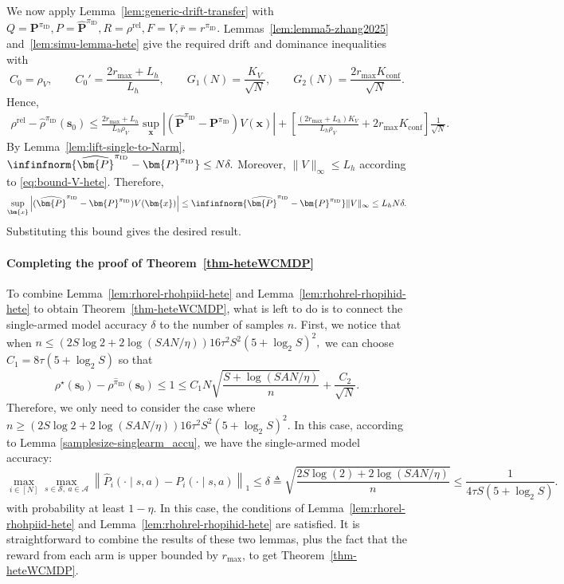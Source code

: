 \documentclass[mnsc,nonblindrev]{informs3}
\newcommand{\bp}{\bm{P}}
\newcommand{\bphat}{\widehat{\bm{P}}}
\newcommand{\piid}{\pi_{\mathrm{ID}}}
\newcommand{\pihid}{\widehat{\pi}_{\mathrm{ID}}}
\newcommand{\bms}{\bm{s}}
\newcommand{\bmx}{\bm{x}}
\newcommand{\rhorel}{\rho^{\mathrm{rel}}}
\begin{document}
We now apply Lemma~\ref{lem:generic-drift-transfer} with
\(
    Q=\bp^{\piid},
    P=\bphat^{\piid},
    R=\rhorel,
    F=V,
    \bar r=r^{\piid}.
\)
Lemmas~\ref{lem:lemma5-zhang2025} and~\ref{lem:simu-lemma-hete} give the
required drift and dominance inequalities with
\[
    C_0=\rho_V,
    \qquad
    C_0'=\frac{2r_{\max}+L_h}{L_h},
    \qquad
    G_1(N)=\frac{K_V}{\sqrt N},
    \qquad
    G_2(N)=\frac{2r_{\max}K_{\mathrm{conf}}}{\sqrt N}.
\]
Hence,
\[
\begin{aligned}
    \rhorel-\widehat\rho^{\piid}(\bms_0)
    \le
    \frac{2r_{\max}+L_h}{L_h\rho_V}
    \sup_{\bmx}
    \left|
    (\bphat^{\piid}-\bp^{\piid})V(\bmx)
    \right|  +
    \left[
    \frac{(2r_{\max}+L_h)K_V}{L_h\rho_V}
    +
    2r_{\max}K_{\mathrm{conf}}
    \right]\frac1{\sqrt N}.
\end{aligned}
\]
By Lemma~\ref{lem:lift-single-to-Narm},
\(
    \infinfnorm{\bphat^{\piid}-\bp^{\piid}}
    \le
    N\delta .
\)
Moreover, \(\|V\|_\infty\le L_h\) according to \eqref{eq:bound-V-hete}. Therefore,
\[
\begin{aligned}
    \sup_{\bmx}
    \left|
    (\bphat^{\piid}-\bp^{\piid})V(\bmx)
    \right|
    \le
    \infinfnorm{\bphat^{\piid}-\bp^{\piid}}\|V\|_\infty 
    \le
    L_hN\delta .
\end{aligned}
\]
Substituting this bound gives the desired result.

\paragraph{Completing the proof of Theorem~\ref{thm-heteWCMDP}}\label{subsec:final-pr-thm1}
To combine Lemma~\ref{lem:rhorel-rhohpiid-hete} and Lemma~\ref{lem:rhohrel-rhopihid-hete} to obtain Theorem~\ref{thm-heteWCMDP}, what is left to do is to connect the single-armed model accuracy $\delta$ to the number of samples $n$. 
First, we notice that when
$
n\le\left(2S\log2+2\log(SAN/\eta)\right)16\tau^2S^2(5+\log_2S)^2,
$
we can choose $C_1=8\tau(5+\log_2S)$ so that
\[
    \rho^\star(\bms_0)-\rho^{\pihid}(\bms_0)\le 1\le C_1N\sqrt{\frac{S + \log (SAN/\eta)}{n}}+\frac{C_2}{\sqrt{N}} .
\]
Therefore, we only need to consider the case where
$n\ge\left(2S\log2+2\log(SAN/\eta)\right)16\tau^2S^2(5+\log_2S)^2.$
In this case, according to Lemma \ref{samplesize-singlearm_accu}, we have the single-armed model accuracy:
\[
\max_{i\in [N]}\max_{s \in \mathcal{S},\ a \in \mathcal{A}} \left\| \widehat{P}_i(\cdot \mid s, a) - P_i(\cdot \mid s, a) \right\|_1 \le \delta\triangleq \sqrt{\frac{2S \log(2) + 2\log (SAN/\eta)}{n}}\le\frac{1}{4\tau S(5+\log_2S)}.
\]
with probability at least $1-\eta$. In this case, the conditions of Lemma~\ref{lem:rhorel-rhohpiid-hete} and Lemma~\ref{lem:rhohrel-rhopihid-hete} are satisfied. It is straightforward to combine the results of these two lemmas, plus the fact that the reward from each arm is upper bounded by $r_{\max}$, to get Theorem~\ref{thm-heteWCMDP}.
\end{document}
